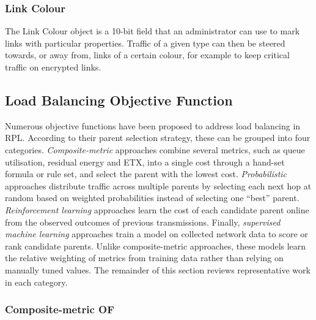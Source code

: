 \subsubsection{Link Colour}
The Link Colour object is a 10-bit field that an administrator can
use to mark links with particular properties. Traffic of a given type
can then be steered towards, or away from, links of a certain colour,
for example to keep critical traffic on encrypted links.

\subsection{Load Balancing Objective Function}
Numerous objective functions have been proposed to address load
balancing in RPL. According to their parent selection strategy, these
can be grouped into four categories. \emph{Composite-metric} approaches
combine several metrics, such as queue utilisation, residual energy and
ETX, into a single cost through a hand-set formula or rule set, and
select the parent with the lowest cost. \emph{Probabilistic} approaches
distribute traffic across multiple parents by selecting each next hop at random
based on weighted probabilities instead of selecting one ``best''
parent. \emph{Reinforcement learning} approaches learn the cost of
each candidate parent online from the
observed outcomes of previous transmissions.
Finally, \emph{supervised
machine learning} approaches train a model on collected network data to
score or rank candidate parents. Unlike composite-metric approaches,
these models learn the relative weighting of metrics from training data
rather than relying on manually tuned values. The remainder of this
section reviews representative work in each category.

\subsubsection{Composite-metric OF}

